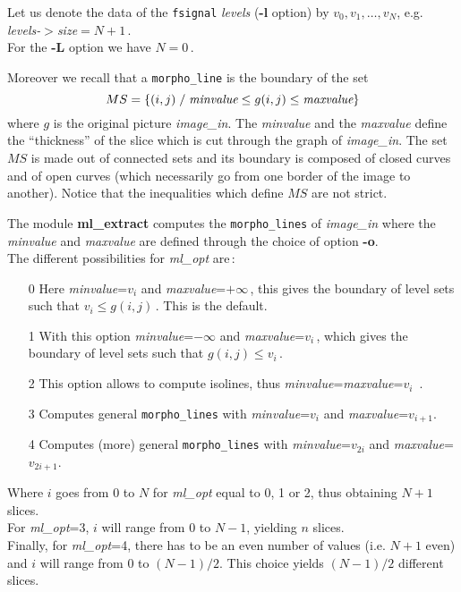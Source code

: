 Let us denote the data of the {\tt fsignal} {\em levels} ({\bf -l} option) by
$v_0, v_1,\ldots, v_N$, e.g. {\em levels-$>$size}$=N+1$\,. \\
For the {\bf -L} option we have $N=0$\,.

\smallskip

Moreover we recall that a {\tt morpho\_line} is the boundary of the set
$$ MS=\{(i,j) \;/\; \mbox{\em minvalue}\leq 
                       g(i,j)\leq\mbox{\em maxvalue} \}$$
where $g$ is the original picture {\em image\_in}. The {\em minvalue} and
the {\em maxvalue} define the ``thickness'' of the slice which is cut
 through the graph of {\em image\_in}. The set $MS$ is made out of 
connected sets and its boundary is composed of closed curves and of
open curves (which necessarily go from one border of the image to another).
Notice that the inequalities which define $MS$ are not strict.

\smallskip

The module {\bf ml\_extract} computes 
the {\tt morpho\_lines} of {\em image\_in}
where the {\em minvalue} and {\em maxvalue} are defined 
through the choice of option {\bf -o}.  \\
The different possibilities for {\em ml\_opt} are\,:
\begin{itemize}
\item[ 0 ] Here {\em minvalue}=$v_i$ and 
  {\em maxvalue}=$+\infty$\,, this gives the boundary of level sets \\
such that $v_i\leq g(i,j)$\,.
This is the default. 
\item[ 1 ] With this option  {\em minvalue}=$-\infty$ and 
  {\em maxvalue}=$v_i$\,, which gives the boundary of level sets 
such that $g(i,j)\leq v_i$\,.
\item[ 2 ] This option allows to compute isolines, thus 
 {\em minvalue}={\em maxvalue}=$v_i$\, .
\item[ 3 ] Computes general {\tt morpho\_lines} with 
{\em minvalue}=$v_i$ and {\em maxvalue}=$v_{i+1}$.
\item[ 4 ] Computes (more) general {\tt morpho\_lines} with 
{\em minvalue}=$v_{2i}$ and {\em maxvalue}=$v_{2i+1}$.
\end{itemize}
Where $i$ goes from 0 to $N$ for {\em ml\_opt} equal to 0, 1 or 2, 
thus obtaining $N+1$ slices.\\
For {\em ml\_opt}=3, $i$ will range from 0 to $N-1$, yielding $n$ slices. \\
Finally, for {\em ml\_opt}=4, there has to be an even number of values 
(i.e. $N+1$ even) and $i$ will range from 0 to $(N-1)/2$. This choice 
yields  $(N-1)/2$ different slices.

